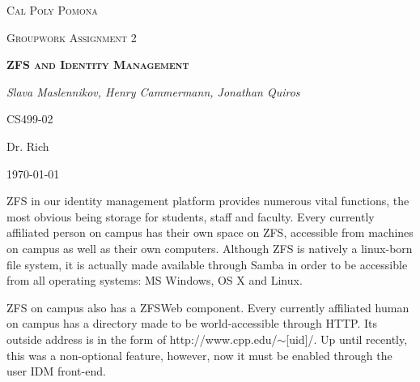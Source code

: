 \documentclass[letterpaper,12pt,titlepage]{article}
\author{Slava Maslennikov \and Henry Cammermann \and Jonathan Quiros}
\date{Monday, March 7th 2016}
\begin{document}

\begin{titlepage}
\centering
{\scshape\LARGE Cal Poly Pomona\par}
\vspace{1cm}
{\scshape\Large Groupwork Assignment 2\par}
\vspace{1.5cm}
{\scshape\bfseries ZFS and Identity Management\par}
\vspace{2cm}
{\Large\itshape Slava Maslennikov, Henry Cammermann, Jonathan Quiros\par}
\vfill
CS499-02\par
Dr. Rich
\vfill
{\large \today\par}
\end{titlepage}

%

ZFS in our identity management platform provides numerous vital functions, the most obvious being storage for students, staff and faculty. Every currently affiliated person on campus has their own space on ZFS, accessible from machines on campus as well as their own computers. Although ZFS is natively a linux-born file system, it is actually made available through Samba in order to be accessible from all operating systems: MS Windows, OS X and Linux. 

ZFS on campus also has a ZFSWeb component. Every currently affiliated human on campus has a directory made to be world-accessible through HTTP. Its outside address is in the form of http://www.cpp.edu/$\sim$[uid]/. Up until recently, this was a non-optional feature, however, now it must be enabled through the user IDM front-end. 
\end{document}
